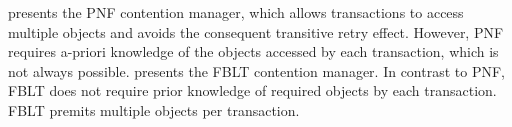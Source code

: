 \documentclass[10pt, conference, compsocconf]{IEEEtran}
\begin{document}
%
\cite{pnf_dac_asp} presents the PNF contention manager, which allows transactions to access  multiple objects and avoids the consequent transitive retry effect. 
However, PNF requires a-priori knowledge of the objects accessed by each transaction, which is not always possible. 
%
\cite{fblt} presents the FBLT contention manager. In contrast to PNF, FBLT does not require prior knowledge of required objects by each transaction. FBLT premits multiple objects per transaction.
\end{document}
